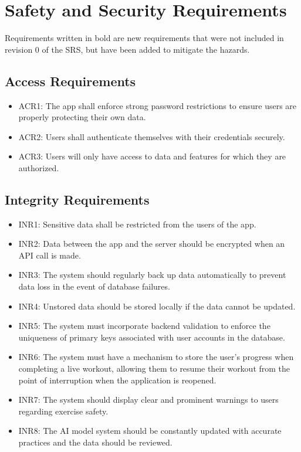 \documentclass{article}
\begin{document}
    \section{Safety and Security Requirements}

    Requirements written in bold are new requirements that were not included in revision 0 of the SRS, but have been added to mitigate the hazards.

    \subsection{Access Requirements}
    \begin{itemize}
        \item ACR1: The app shall enforce strong password restrictions to ensure users are properly protecting their own data.
        \item ACR2: Users shall authenticate themselves with their credentials securely.
        \item ACR3: Users will only have access to data and features for which they are authorized.
    \end{itemize}

    \subsection{Integrity Requirements}
    \begin{itemize}
        \item INR1: Sensitive data shall be restricted from the users of the app.
        \item INR2: Data between the app and the server should be encrypted when an API call is made.
        \item INR3: The system should regularly back up data automatically to prevent data loss in the event of database failures.
        \item INR4: Unstored data should be stored locally if the data cannot be updated.
        \item INR5: The system must incorporate backend validation to enforce the uniqueness of primary keys associated with user accounts in the database.
        \item INR6: The system must have a mechanism to store the user's progress when completing a live workout, allowing them to resume their workout from the point of interruption when the application is reopened.
        \item INR7: The system should display clear and prominent warnings to users regarding exercise safety.
        \item INR8: The AI model system should be constantly updated with accurate practices and the data should be reviewed.
    \end{itemize}
\end{document}
